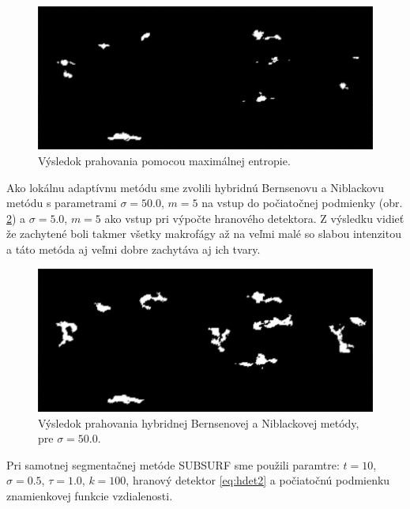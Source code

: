 \documentclass[a4paper,11pt,oneside]{article}%
\begin{document}
\begin{figure}[H]
 \begin{center} 
 \includegraphics[scale=0.50]{pics/vysek_kapur.png}
\caption{Výsledok prahovania pomocou maximálnej entropie.}
\label{fig:vysek_kapur}
\end{center} 
\end{figure}

Ako lokálnu adaptívnu metódu sme zvolili hybridnú Bernsenovu a Niblackovu metódu s parametrami $\sigma = 50.0$, $m = 5$ na vstup do počiatočnej podmienky (obr. \ref{fig:vysek_nb}) a $\sigma = 5.0$, $m = 5$ ako vstup pri výpočte hranového detektora. Z výsledku vidieť že zachytené boli takmer všetky makrofágy až na veľmi malé so slabou intenzitou a táto metóda aj veľmi dobre zachytáva aj ich tvary. 

\begin{figure}[H]
 \begin{center} 
 \includegraphics[scale=0.50]{pics/vysek_hybrid_nb.png}
\caption{Výsledok prahovania hybridnej Bernsenovej a Niblackovej metódy, pre $\sigma = 50.0$.}
\label{fig:vysek_nb}
\end{center} 
\end{figure}

Pri samotnej segmentačnej metóde SUBSURF sme použili paramtre: $t = 10$, $\sigma = 0.5$, $\tau = 1.0$, $k = 100$, hranový detektor \ref{eq:hdet2} a počiatočnú podmienku znamienkovej funkcie vzdialenosti.
\end{document}
